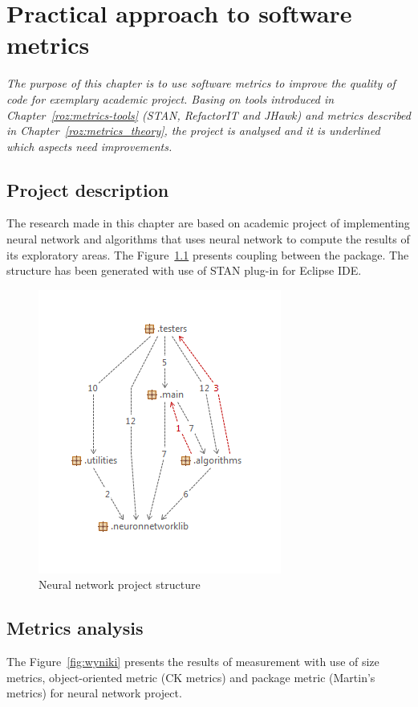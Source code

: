 \chapter{Practical approach to software metrics} \label{roz:metrics-practic}

\textit{The purpose of this chapter is to use software metrics to improve the quality of code for exemplary academic project. Basing on tools introduced in Chapter~\ref{roz:metrics-tools} (STAN, RefactorIT and JHawk) and metrics described in Chapter~\ref{roz:metrics_theory}, the project is analysed and it is underlined which aspects need improvements.}

\section{Project description}
The research made in this chapter are based on academic project of implementing neural network and algorithms that uses neural network to compute the results of its exploratory areas. The Figure~\ref{fig:structureneural} presents coupling between the package. The structure has been generated with use of STAN plug-in for Eclipse \ac{IDE}. 

\begin{figure}[h!]
 	\centering
 	\includegraphics[scale=1]{img/str.png} 
 	\caption{Neural network project structure}		
 	\label{fig:structureneural}
 \end{figure} 






\section{Metrics analysis}
The Figure~\ref{fig:wyniki} presents the results of measurement with use of size metrics, object-oriented metric (\ac{CK metrics}) and package metric (Martin's metrics) for neural network project.  

